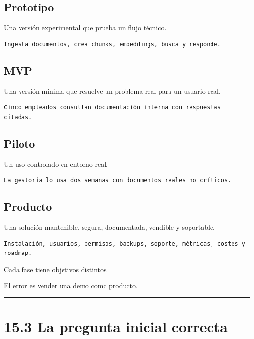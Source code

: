 \subsection{Prototipo}\label{prototipo-2}

Una versión experimental que prueba un flujo técnico.

\begin{lstlisting}
Ingesta documentos, crea chunks, embeddings, busca y responde.
\end{lstlisting}

\subsection{MVP}\label{mvp-2}

Una versión mínima que resuelve un problema real para un usuario real.

\begin{lstlisting}
Cinco empleados consultan documentación interna con respuestas citadas.
\end{lstlisting}

\subsection{Piloto}\label{piloto}

Un uso controlado en entorno real.

\begin{lstlisting}
La gestoría lo usa dos semanas con documentos reales no críticos.
\end{lstlisting}

\subsection{Producto}\label{producto-2}

Una solución mantenible, segura, documentada, vendible y soportable.

\begin{lstlisting}
Instalación, usuarios, permisos, backups, soporte, métricas, costes y roadmap.
\end{lstlisting}

Cada fase tiene objetivos distintos.

El error es vender una demo como producto.

\begin{center}\rule{0.5\linewidth}{0.5pt}\end{center}

\section{15.3 La pregunta inicial
correcta}\label{la-pregunta-inicial-correcta}

